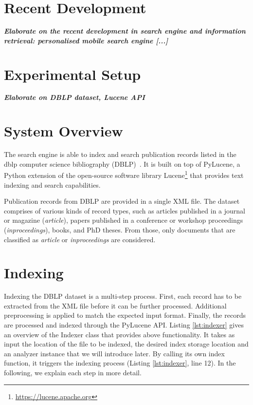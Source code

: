 \documentclass{sig-alternate-05-2015}
\begin{document}
\section{Recent Development}
\textit{\textbf{Elaborate on the recent development in search engine and information retrieval: personalised mobile search engine [...]}}
\section{Experimental Setup}
\textit{\textbf{Elaborate on DBLP dataset, Lucene API}}

\section{System Overview}

The search engine is able to index and search publication records listed in the dblp computer science bibliography (DBLP)~\cite{dblp}. It is built on top of PyLucene, a Python extension of the open-source software library Lucene\footnote{\url{https://lucene.apache.org}} that provides text indexing and search capabilities.

Publication records from DBLP are provided in a single XML file. The dataset comprises of various kinds of record types, such as articles published in a journal or magazine (\emph{article}), papers published in a conference or workshop proceedings (\emph{inproceedings}), books, and PhD theses. From those, only documents that are classified as \emph{article} or \emph{inproceedings} are considered.

\section{Indexing}

Indexing the DBLP dataset is a multi-step process. First, each record has to be extracted from the XML file before it can be further processed. Additional preprocessing is applied to match the expected input format. Finally, the records are processed and indexed through the PyLucene API. Listing \ref{lst:indexer} gives an overview of the Indexer class that provides above functionality. It takes as input the location of the file to be indexed, the desired index storage location and an analyzer instance that we will introduce later. By calling its own index function, it triggers the indexing process (Listing \ref{lst:indexer}, line 12). In the following, we explain each step in more detail.
\end{document}
